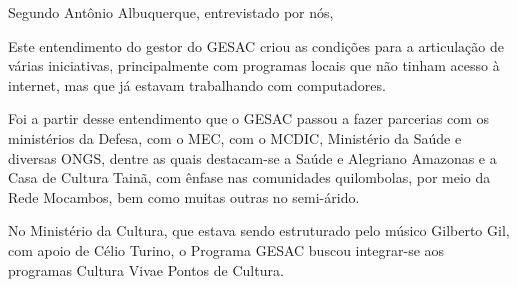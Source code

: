 \documentclass[
12pt,		%
openright,	%
twoside,  %
a4paper,			%
chapter=TITLE,		%
english,			%
french,				%
spanish,			%
brazil				%
]{USPSC-classe/USPSC}
\begin{document}
Segundo Ant\^onio Albuquerque, entrevistado por n\'os,










\noindent\begin{center}\mbox{\centering{}}\end{center}


Este entendimento do gestor do GESAC criou as condi\c{c}\~oes para a articula\c{c}\~ao de v\'arias iniciativas, principalmente com programas locais que n\~ao tinham acesso \`a internet, mas que j\'a estavam trabalhando com computadores.









Foi a partir desse entendimento que o GESAC passou a fazer parcerias com os minist\'erios da Defesa, com o MEC, com o MCDIC,  Minist\'erio da Sa\'ude e diversas ONGS, dentre as quais destacam-se a \textquotedbl Sa\'ude e Alegria\textquotedbl   no Amazonas e a \textquotedbl Casa de Cultura Tain\~a\textquotedbl , com \^enfase nas comunidades quilombolas, por meio da Rede Mocambos, bem como muitas outras no semi-\'arido.









No Minist\'erio da Cultura, que estava sendo estruturado pelo m\'usico Gilberto Gil, com apoio de C\'elio Turino, o Programa GESAC buscou integrar-se aos programas \textquotedbl Cultura Viva\textquotedbl  e \textquotedbl Pontos de Cultura\textquotedbl .
\end{document}
